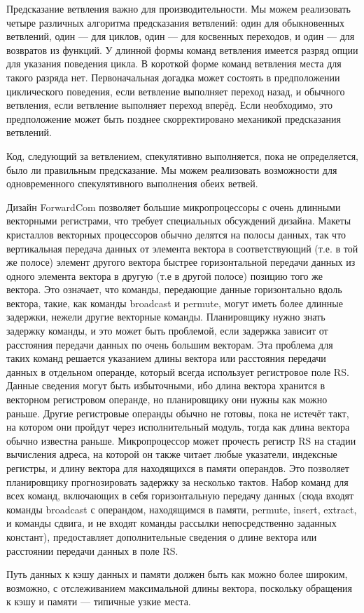 \documentclass[forwardcom.tex]{subfiles}
\begin{document}
Предсказание ветвления важно для производительности. Мы можем реализовать четыре различных алгоритма предсказания ветвлений: один для обыкновенных ветвлений, один --- для циклов, один --- для косвенных переходов, и один --- для возвратов из функций. У длинной формы команд ветвления имеется разряд опции для указания поведения цикла. В короткой форме команд ветвления места для такого разряда нет. Первоначальная догадка может состоять в предположении циклического поведения, если ветвление выполняет переход назад, и обычного ветвления, если ветвление выполняет переход вперёд. Если необходимо, это предположение может быть позднее скорректировано механикой  предсказания ветвлений. 

Код, следующий за ветвлением, спекулятивно выполняется, пока не определяется, было ли правильным предсказание. Мы можем реализовать возможности для одновременного спекулятивного выполнения обеих ветвей.

Дизайн  ForwardCom позволяет большие микропроцессоры с очень длинными векторными регистрами, что требует специальных обсуждений дизайна. Макеты кристаллов векторных процессоров обычно делятся на \glqq полосы данных\grqq, так что вертикальная передача данных от элемента вектора в соответствующий (т.е. в той же полосе) элемент другого вектора быстрее горизонтальной передачи данных из одного элемента вектора в другую (т.е в другой полосе) позицию того же вектора. Это означает, что команды, передающие данные горизонтально вдоль вектора, такие, как команды broadcast и permute, могут иметь более длинные задержки, нежели другие векторные команды. Планировщику нужно знать задержку команды, и это может быть проблемой, если задержка зависит от расстояния передачи данных по очень большим векторам. Эта проблема для таких команд решается указанием длины вектора или расстояния передачи данных в отдельном операнде, который всегда использует регистровое поле RS. Данные сведения могут быть избыточными, ибо длина вектора хранится в векторном регистровом операнде, но планировщику они нужны как можно раньше. Другие регистровые операнды обычно не готовы, пока не истечёт такт, на котором они пройдут через исполнительный модуль, тогда как длина вектора обычно известна раньше. Микропроцессор может прочесть регистр RS на стадии вычисления адреса, на которой он также читает любые указатели, индексные регистры, и длину вектора для находящихся в памяти операндов. Это позволяет планировщику прогнозировать задержку за несколько тактов. Набор команд для всех команд, включающих в себя горизонтальную передачу данных (сюда входят команды broadcast с операндом, находящимся в памяти, permute, insert, extract, и команды сдвига, и не входят команды рассылки непосредственно заданных констант), предоставляет дополнительные сведения о длине вектора или расстоянии передачи данных в поле RS. 

Путь данных к кэшу данных и памяти должен быть как можно более широким, возможно, с отслеживанием максимальной длины вектора, поскольку обращения к кэшу и памяти --- типичные узкие места.
\end{document}
